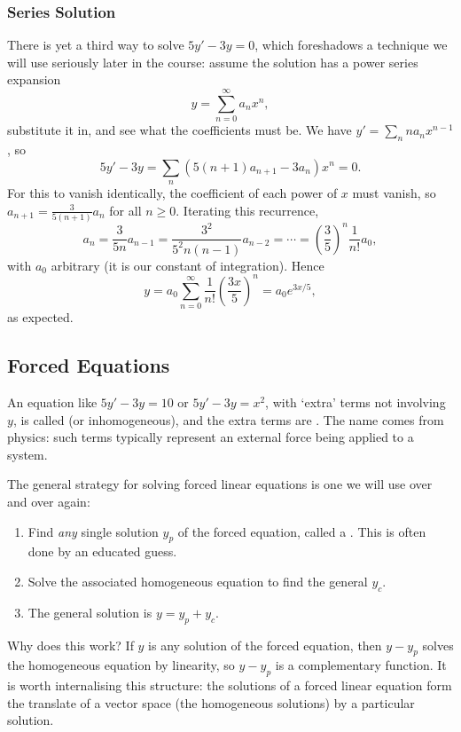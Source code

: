 \subsubsection{Series Solution}

There is yet a third way to solve $5y' - 3y = 0$, which foreshadows a technique we will use seriously later in the course: assume the solution has a power series expansion
$$
y = \sum_{n = 0}^{\infty} a_n x^n,
$$
substitute it in, and see what the coefficients must be. We have $y' = \sum_n n a_n x^{n - 1}$, so
$$
5y' - 3y = \sum_{n} \left(5 (n+1) a_{n+1} - 3a_n\right) x^n = 0.
$$
For this to vanish identically, the coefficient of each power of $x$ must vanish, so $a_{n+1} = \frac{3}{5(n+1)} a_n$ for all $n \geq 0$. Iterating this recurrence,
$$
a_n = \frac{3}{5n} a_{n - 1} = \frac{3^2}{5^2 n (n-1)} a_{n - 2} = \cdots = \left(\frac{3}{5}\right)^n \frac{1}{n!} a_0,
$$
with $a_0$ arbitrary (it is our constant of integration). Hence
$$
y = a_0 \sum_{n = 0}^{\infty} \frac{1}{n!}\left(\frac{3x}{5}\right)^n = a_0 e^{3x/5},
$$
as expected.

\subsection{Forced Equations}

An equation like $5y' - 3y = 10$ or $5y' - 3y = x^2$, with `extra' terms not involving $y$, is called  (or inhomogeneous), and the extra terms are . The name comes from physics: such terms typically represent an external force being applied to a system.

The general strategy for solving forced linear equations is one we will use over and over again:
\begin{enumerate}[label=(\arabic*)]
	\item Find \emph{any} single solution $y_p$ of the forced equation, called a . This is often done by an educated guess.
	\item Solve the associated homogeneous equation to find the general  $y_c$.
	\item The general solution is $y = y_p + y_c$.
\end{enumerate}
Why does this work? If $y$ is any solution of the forced equation, then $y - y_p$ solves the homogeneous equation by linearity, so $y - y_p$ is a complementary function. It is worth internalising this structure: the solutions of a forced linear equation form the translate of a vector space (the homogeneous solutions) by a particular solution.

